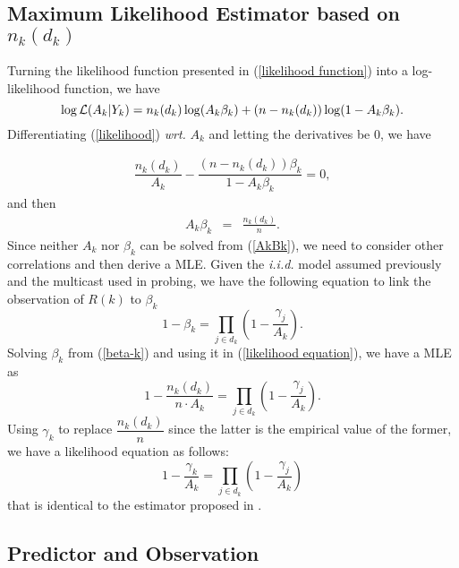 \documentclass[10pt,onecolumn]{IEEEtran}
\begin{document}
\subsection{Maximum Likelihood Estimator based on $n_k(d_k)$} \label{2.a}

Turning the likelihood function presented in (\ref{likelihood function}) into a log-likelihood function, we have
 \begin{equation}
 \log {\cal L}(A_k|Y_k)=n_k(d_k)\log (A_k\beta_k)+(n-n_k(d_k))\log(1-A_k\beta_k).
 \label{likelihood}
 \end{equation}
 Differentiating (\ref{likelihood}) {\it wrt.} $A_k$
and letting the derivatives be 0, we have

\begin{eqnarray}
\dfrac{n_k(d_k)}{A_k}-\dfrac{(n-n_k(d_k))\beta_k}{1-A_k\beta_k}=0,
\label{likelihood equation}
\end{eqnarray}
and then
\begin{eqnarray}
A_k\beta_k&=&\frac{n_k(d_k)}{n}.
\label{AkBk}
\end{eqnarray}
Since neither $A_k$ nor $\beta_k$ can be solved from (\ref{AkBk}), we need to consider other correlations and then derive a MLE.
Given the {\it i.i.d.} model assumed previously and the multicast used in probing, we have the following equation to link the observation of $R(k)$ to $\beta_k$
\begin{equation}
1-\beta_k=\prod_{j \in d_k} (1-\dfrac{\gamma_j}{A_k}).
\label{beta-k}
\end{equation}
Solving $\beta_k$ from (\ref{beta-k}) and using it in (\ref{likelihood equation}), we have a MLE as
\begin{equation}
1-\dfrac{n_k(d_k)}{n \cdot A_k}=\prod_{j \in d_k} (1-\dfrac{\gamma_j}{A_k}).
\label{realmle1}
\end{equation}
Using $\gamma_k$ to replace $\dfrac{n_k(d_k)}{n}$ since the latter is the empirical value of the former, we have a likelihood equation as follows:
\begin{equation}
1-\dfrac{\gamma_k}{A_k}=\prod_{j \in d_k} (1-\dfrac{\gamma_j}{A_k})
\label{minc}
\end{equation}
that is identical to the estimator proposed in \cite{CDHT99}.



\subsection{Predictor and  Observation}
\end{document}
